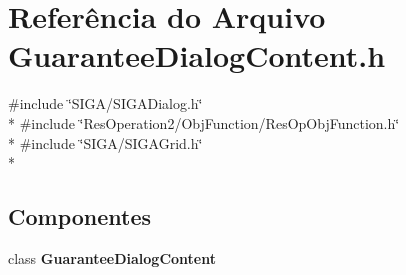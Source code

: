 \section{Referência do Arquivo Guarantee\+Dialog\+Content.\+h}
\label{_2_obj_function_2_guarantee_2_guarantee_dialog_content_8h}
{\ttfamily \#include \char`\"{}S\+I\+G\+A/\+S\+I\+G\+A\+Dialog.\+h\char`\"{}}\\*
{\ttfamily \#include \char`\"{}Res\+Operation2/\+Obj\+Function/\+Res\+Op\+Obj\+Function.\+h\char`\"{}}\\*
{\ttfamily \#include \char`\"{}S\+I\+G\+A/\+S\+I\+G\+A\+Grid.\+h\char`\"{}}\\*
\subsection*{Componentes}
\begin{DoxyCompactItemize}
\item 
class {\bf Guarantee\+Dialog\+Content}
\end{DoxyCompactItemize}
